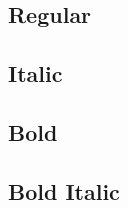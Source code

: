 \documentclass{article}
\begin{document}
\subsection*{Regular}
\lipsum[1]

\subsection*{Italic}
\textit{\lipsum[2]}

\subsection*{Bold}
\textbf{\lipsum[3]}

\subsection*{Bold Italic}

\textbf{\textit{\lipsum[4]}}
\end{document}
